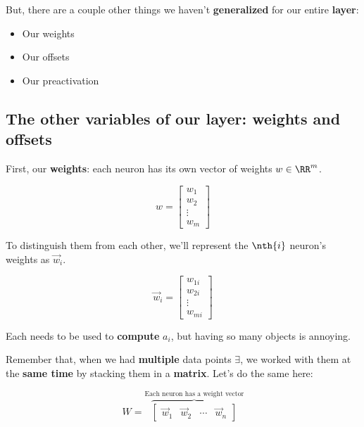         But, there are a couple other things we haven't \textbf{generalized} for our entire \textbf{layer}:
        
        \begin{itemize}
            \item Our weights 
            \item Our offsets
            \item Our preactivation
        \end{itemize}
        
        \subsection{The other variables of our layer: weights and offsets}
        
        First, our \textbf{weights}: each neuron has its own vector of weights $w \in \RR^m$.
            
        \begin{equation}
            w = 
            \begin{bmatrix}
              w_1\\w_2\\ \vdots \\ w_m
            \end{bmatrix}
        \end{equation}
        
        To distinguish them from each other, we'll represent the $\nth{i}$ neuron's weights as $\vec{w}_i$.
        
        \begin{equation}
            \vec{w}_i = 
            \begin{bmatrix}
              w_{1i}\\w_{2i}\\ \vdots \\ w_{mi}
            \end{bmatrix}
        \end{equation}
            
        Each needs to be used to \textbf{compute} $a_i$, but having so many objects is annoying.
        
        Remember that, when we had \textbf{multiple} data points $\exi$, we worked with them at the \textbf{same time} by stacking them in a \textbf{matrix}. Let's do the same here:
        
        \begin{equation}
            W = 
            \overbrace{
                \begin{bmatrix}
                  \vec{w}_1 & \vec{w}_2 & \cdots & \vec{w}_n
                \end{bmatrix}
            }^{\text{Each neuron has a weight vector}}
        \end{equation}
        
